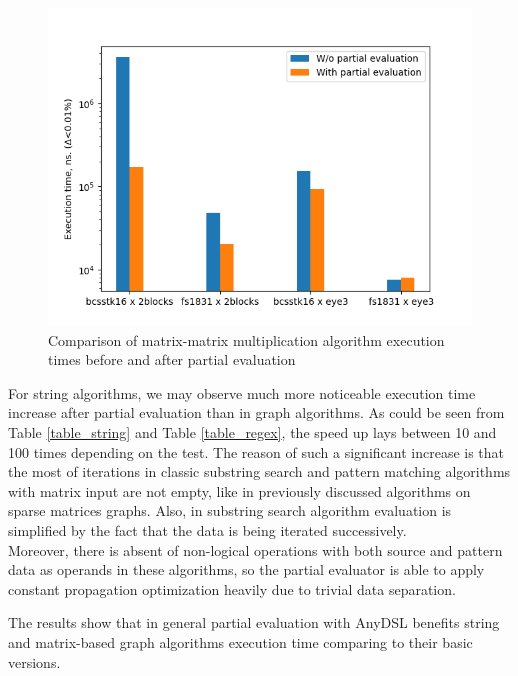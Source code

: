 \documentclass[conference]{IEEEtran}
\begin{document}
\begin{figure}[H]
	\centering
	\includegraphics[scale=0.6]{matrix-mult}
	\caption{Comparison of matrix-matrix multiplication algorithm execution times before and after partial evaluation}
	\label{fig:multpe}
\end{figure}

For string algorithms, we may observe much more noticeable execution time increase after partial evaluation than in graph algorithms. As could be seen from Table \ref{table_string} and Table \ref{table_regex}, the speed up lays between 10 and 100 times depending on the test. The reason of such a significant increase is that the most of iterations in classic substring search and pattern matching algorithms \cite{cormen2009introduction} with matrix input are not empty, like in previously discussed algorithms on sparse matrices graphs. Also, in substring search algorithm evaluation is simplified by the fact that the data is being iterated successively.\\
Moreover, there is absent of non-logical operations with both source and pattern data as operands in these algorithms, so the partial evaluator is able to apply constant propagation optimization heavily due to trivial data separation.

The results show that in general partial evaluation with AnyDSL benefits string and matrix-based graph algorithms execution time comparing to their basic versions.

\end{document}

